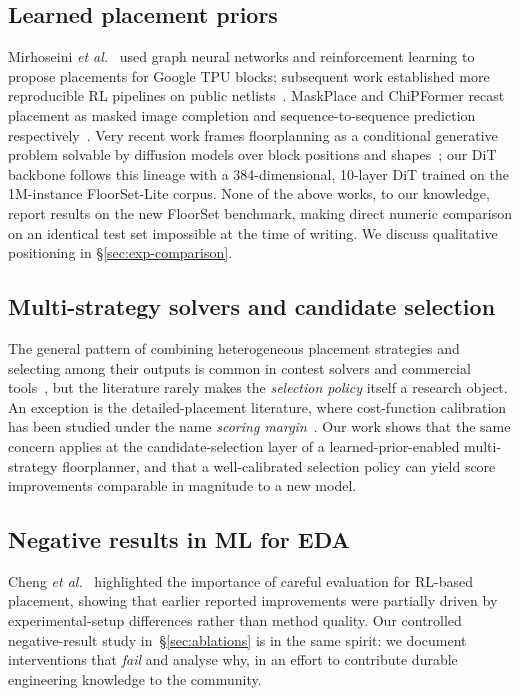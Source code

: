 \documentclass[nolineno]{ieeeaccess}
\begin{document}
\subsection{Learned placement priors}
Mirhoseini \emph{et al.}~\cite{mirhoseini2021graph} used graph neural
networks and reinforcement learning to propose placements for Google
TPU blocks; subsequent work established more reproducible RL
pipelines on public netlists~\cite{cheng2023assessment}. MaskPlace
and ChiPFormer recast placement as masked image completion and
sequence-to-sequence prediction
respectively~\cite{lai2022maskplace,lai2023chipformer}. Very recent
work frames floorplanning as a conditional generative problem solvable
by diffusion models over block positions and
shapes~\cite{peebles2022dit,song2021ddim,ho2020ddpm}; our DiT
backbone follows this lineage with a 384-dimensional, 10-layer DiT
trained on the 1M-instance FloorSet-Lite corpus. None of the
above works, to our knowledge, report results on the new
FloorSet benchmark, making direct numeric comparison on an identical
test set impossible at the time of writing. We discuss qualitative
positioning in \S\ref{sec:exp-comparison}.

\subsection{Multi-strategy solvers and candidate selection}
The general pattern of combining heterogeneous placement strategies
and selecting among their outputs is common in contest solvers and
commercial tools~\cite{parquet2008,brenner2011bonnplace}, but the
literature rarely makes the \emph{selection policy} itself a research
object. An exception is the detailed-placement literature, where
cost-function calibration has been studied under the name
\emph{scoring margin}~\cite{roy2005detailedplace}. Our work shows that
the same concern applies at the candidate-selection layer of a
learned-prior-enabled multi-strategy floorplanner, and that a
well-calibrated selection policy can yield score improvements
comparable in magnitude to a new model.

\subsection{Negative results in ML for EDA}
Cheng \emph{et al.}~\cite{cheng2023assessment} highlighted the importance
of careful evaluation for RL-based placement, showing that earlier
reported improvements were partially driven by experimental-setup
differences rather than method quality. Our controlled negative-result
study in~\S\ref{sec:ablations} is in the same spirit: we document
interventions that \emph{fail} and analyse why, in an effort to
contribute durable engineering knowledge to the community.
\end{document}
